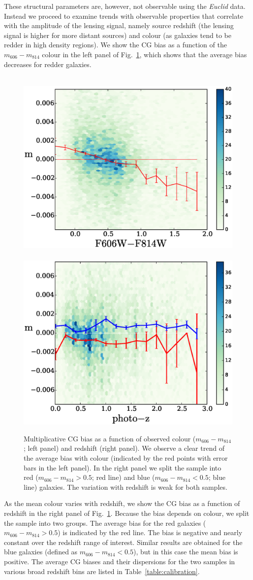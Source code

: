 \documentclass[useAMS,usenatbib]{mnras}
\begin{document}
These structural parameters are, however, not observable using the {\it Euclid} data. Instead we proceed to examine trends with observable properties that correlate with the amplitude of the lensing signal, namely source redshift (the lensing signal is higher for more distant sources) and colour (as galaxies tend to be redder in high density regions). We show the CG bias as a function of the $m_{606}-m_{814}$ colour in the left panel of Fig.~\ref{fig:cg2color}, which shows that the average bias decreases for redder galaxies.  

%
\begin{figure}
\hbox{%
\includegraphics[width=0.5\hsize]{zheatcolor29.eps}
\includegraphics[width=0.5\hsize]{zphotozheat29.eps}}
\caption{Multiplicative CG bias as a function of observed colour ($m_{606}-m_{814}$; left panel)
and redshift (right panel). We observe a clear trend of the average bias with colour (indicated by
the red points with error bars in the left panel). In the right panel we split the sample into red
($m_{606}-m_{814}>0.5$; red line) and blue ($m_{606}-m_{814}<0.5$; blue line) galaxies. The
variation with redshift is weak for both samples.}
\label{fig:cg2color}
\end{figure}


As the mean colour varies with redshift, we show the CG bias as a function of redshift in the right panel of
Fig.~\ref{fig:cg2color}.  Because the bias depends on colour, we split the sample into two groups. The average bias for the red galaxies ($m_{606}-m_{814}>0.5$) is indicated by the red line. The bias is negative and nearly constant over the redshift range of interest. Similar results are obtained for the blue galaxies
(defined as $m_{606}-m_{814}<0.5$), but in this case the mean bias is positive. The average CG biases and their dispersions for the two samples in various broad redshift bins are listed in Table~\ref{table:calibration}.
\end{document}
